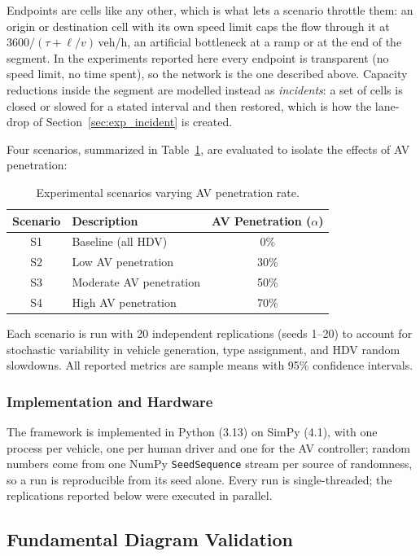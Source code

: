 \documentclass[review,authoryear]{elsarticle}
\begin{document}
Endpoints are cells like any other, which is what lets a scenario throttle them: an origin or destination cell with its own speed limit caps the flow through it at $3600 / (\tau + \ell/v)$\,veh/h, an artificial bottleneck at a ramp or at the end of the segment. In the experiments reported here every endpoint is transparent (no speed limit, no time spent), so the network is the one described above. Capacity reductions inside the segment are modelled instead as \emph{incidents}: a set of cells is closed or slowed for a stated interval and then restored, which is how the lane-drop of Section~\ref{sec:exp_incident} is created.

Four scenarios, summarized in Table~\ref{tab:scenarios}, are evaluated to isolate the effects of AV penetration:

\begin{table}[ht]
\centering
\caption{Experimental scenarios varying AV penetration rate.}
\label{tab:scenarios}
\begin{tabular}{@{}clc@{}}
\toprule
Scenario & Description & AV Penetration ($\alpha$) \\
\midrule
S1 & Baseline (all HDV) & 0\% \\
S2 & Low AV penetration & 30\% \\
S3 & Moderate AV penetration & 50\% \\
S4 & High AV penetration & 70\% \\
\bottomrule
\end{tabular}
\end{table}

Each scenario is run with 20 independent replications (seeds 1--20) to account for stochastic variability in vehicle generation, type assignment, and HDV random slowdowns. All reported metrics are sample means with 95\% confidence intervals.

\subsubsection{Implementation and Hardware}

The framework is implemented in Python (3.13) on SimPy (4.1), with one process per vehicle, one per human driver and one for the AV controller; random numbers come from one NumPy \texttt{SeedSequence} stream per source of randomness, so a run is reproducible from its seed alone. Every run is single-threaded; the replications reported below were executed in parallel.


\subsection{Fundamental Diagram Validation}
\label{sec:exp_fd}
\end{document}
